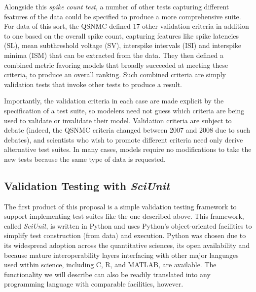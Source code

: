 \documentclass[11pt,letterpaper]{article}
\begin{document}
Alongside this \emph{spike count test}, a number of other tests capturing different features of the data could be specified to produce a more comprehensive suite. For data of this sort, the QSNMC defined 17 other validation criteria in addition to one based on the overall spike count, capturing features like spike latencies (SL), mean subthreshold voltage (SV), interspike intervals (ISI) and interspike minima (ISM) that can be extracted from the data\cite{jolivet_quantitative_2008}. They then defined a combined metric favoring models that broadly succeeded at meeting these criteria, to produce an overall ranking. Such combined criteria are simply validation tests that invoke other tests to produce a result.

Importantly, the validation criteria in each case are made explicit by the specification of a test suite, so modelers need not guess which criteria are being used to validate or invalidate their model. Validation criteria are subject to debate (indeed, the QSNMC criteria changed between 2007 and 2008 due to such debates), and scientists who wish to promote different criteria need only derive alternative test suites. In many cases, models require no modifications to take the new tests because the same type of data is requested.

\subsection{Validation Testing with \emph{SciUnit}} 
The first product of this proposal is a simple validation testing framework to support implementing test suites like the one described above. This framework, called \emph{SciUnit}, is written in Python \cite{python_url} and uses Python's object-oriented facilities to simplify test construction (from data) and execution\cite{python_oo_url}. Python was chosen due to its widespread adoption across the quantitative sciences, its open availability and because mature interoperability layers interfacing with other major languages used within science, including C\cite{python_ctypes_url}, R\cite{r_url}, and MATLAB\cite{matlab_url}, are available. The functionality we will describe can also be readily translated into any programming language with comparable facilities, however.

\end{document}
